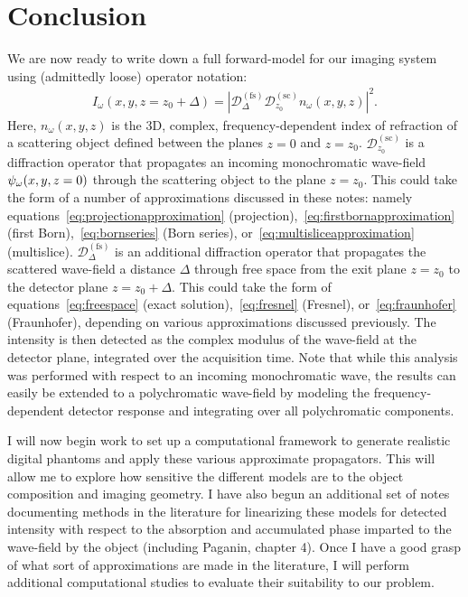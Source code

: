 \documentclass{article}
\begin{document}
\section{Conclusion}

We are now ready to write down a full forward-model for our imaging system using
(admittedly loose) operator notation:
\begin{align}
  I_{\omega}(x,y,z=z_0 + \Delta) = \left|\mathcal{D}^{(\text{fs})}_{\Delta}\mathcal{D}^{(\text{sc})}_{z_0}n_{\omega}(x,y,z)\right|^2. 
\end{align}
Here, $n_{\omega}(x,y,z)$ is the 3D, complex, frequency-dependent index of
refraction of a scattering object defined between the planes $z=0$ and
$z=z_0$. $\mathcal{D}_{z_0}^{(\text{sc})}$ is a diffraction operator that
propagates an incoming monochromatic wave-field $\psi_{\omega}(x,y,z=0)$ through the
scattering object to the plane $z=z_0$. This could take the form of a number of
approximations discussed in these notes: namely
equations~\ref{eq:projectionapproximation}
(projection),~\ref{eq:firstbornapproximation} (first Born),~\ref{eq:bornseries}
(Born series), or~\ref{eq:multisliceapproximation}
(multislice). $\mathcal{D}_{\Delta}^{(\text{fs})}$ is an additional diffraction
operator that propagates the scattered wave-field a distance $\Delta$ through
free space from the exit plane $z=z_0$ to the detector plane $z=z_0 + \Delta$.
This could take the form of equations~\ref{eq:freespace} (exact
solution),~\ref{eq:fresnel} (Fresnel), or~\ref{eq:fraunhofer} (Fraunhofer),
depending on various approximations discussed previously. The intensity is then
detected as the complex modulus of the wave-field at the detector plane,
integrated over the acquisition time. Note that while this analysis was
performed with respect to an incoming monochromatic wave, the results can easily
be extended to a polychromatic wave-field by modeling the frequency-dependent
detector response and integrating over all polychromatic components.

I will now begin work to set up a computational framework to generate realistic
digital phantoms and apply these various approximate propagators.  This will
allow me to explore how sensitive the different models are to the object
composition and imaging geometry. I have also begun an additional set of notes
documenting methods in the literature for linearizing these models for detected
intensity with respect to the absorption and accumulated phase imparted to the
wave-field by the object (including Paganin, chapter 4). Once I have a good
grasp of what sort of approximations are made in the literature, I will perform
additional computational studies to evaluate their suitability to our problem.
\end{document}
